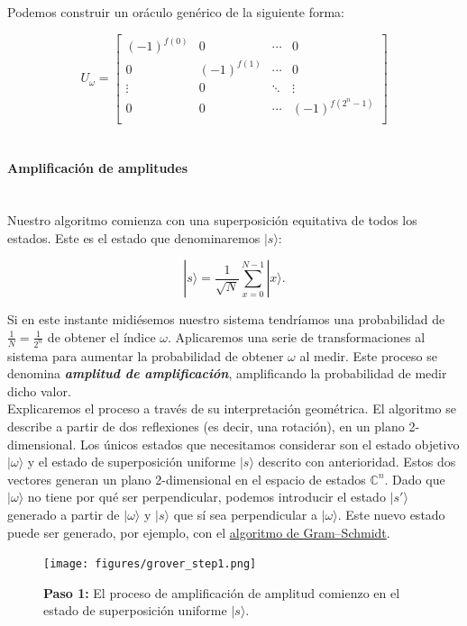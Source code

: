 \documentclass[11pt]{article}
\newcommand{\ra}{\rangle}
\newcommand{\myparagraph}[1]{\paragraph*{ \\ #1}\mbox{}\\}
\theoremstyle{plain}
\begin{document}
Podemos construir un oráculo genérico de la siguiente forma:
	
\[
	U_\omega = 
	\begin{bmatrix}
	(-1)^{f(0)} &   0         & \cdots &   0         \\
	0           & (-1)^{f(1)} & \cdots &   0         \\
	\vdots      &   0         & \ddots & \vdots      \\
	0           &   0         & \cdots & (-1)^{f(2^n-1)} \\
	\end{bmatrix}
\]

\myparagraph{Amplificación de amplitudes}

Nuestro algoritmo comienza con una superposición equitativa de todos los estados. Este es el estado que denominaremos $|s\ra$:

\[
	|s\ra = \frac{1}{\sqrt N} \sum_{x = 0}^{N-1} |x\ra.
\]

Si en este instante midiésemos nuestro sistema tendríamos una probabilidad de $\frac{1}{N} = \frac{1}{2^n}$ de obtener el índice $\omega$. Aplicaremos una serie de transformaciones al sistema para aumentar la probabilidad de obtener $\omega$ al medir. Este proceso se denomina \emph{\textbf{amplitud de amplificación}}, amplificando la probabilidad de medir dicho valor. \\

Explicaremos el proceso a través de su interpretación geométrica. El algoritmo se describe a partir de dos reflexiones (es decir, una rotación), en un plano 2-dimensional. Los únicos estados que necesitamos considerar son el estado objetivo $|\omega\ra$ y el estado de superposición uniforme $|s\ra$ descrito con anterioridad. Estos dos vectores generan un plano 2-dimensional en el espacio de estados $\mathbb{C}^{n}$. Dado que $|\omega\ra$ no tiene por qué ser perpendicular, podemos introducir el estado $|s'\ra$ generado a partir de $|\omega\ra$ y $|s\ra$ que sí sea perpendicular a $|\omega\ra$. Este nuevo estado puede ser generado, por ejemplo, con el  \href{https://en.wikipedia.org/wiki/Gram%E2%80%93Schmidt_process}{algoritmo de Gram–Schmidt}.

\begin{figure}[H]
	\centering
	\texttt{[image: figures/grover\_step1.png]}
	\caption{\textbf{Paso 1:} El proceso de amplificación de amplitud comienzo en el estado de superposición uniforme $|s\ra$.}
\end{figure}
\end{document}
